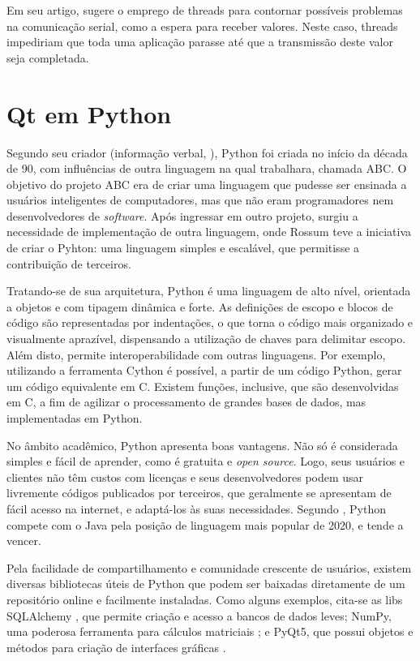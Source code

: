 Em seu artigo,  sugere o emprego de threads para contornar possíveis problemas na comunicação serial, como a espera para receber valores. Neste caso, threads impediriam que toda uma aplicação parasse até que a transmissão deste valor seja completada. 

\section{Qt em Python}

Segundo seu criador (informação verbal, \cite{Rossum2003}), Python foi criada no início da década de 90, com influências de outra linguagem na qual trabalhara, chamada ABC. O objetivo do projeto ABC era de criar uma linguagem que pudesse ser ensinada a usuários inteligentes de computadores, mas que não eram programadores nem desenvolvedores de \textit{software}. Após ingressar em outro projeto, surgiu a necessidade de implementação de outra linguagem, onde Rossum teve a iniciativa de criar o Pyhton: uma  linguagem simples e escalável, que permitisse a contribuição de terceiros.

Tratando-se de sua arquitetura, Python é uma linguagem de alto nível, orientada a objetos e com tipagem dinâmica e forte. As definições de escopo e blocos de código são representadas por indentações, o que torna o código mais organizado e visualmente aprazível, dispensando a utilização de chaves para delimitar escopo. Além disto, permite interoperabilidade com outras linguagens. Por exemplo, utilizando a ferramenta Cython é possível, a partir de um código Python, gerar um código equivalente em C. Existem funções, inclusive, que são desenvolvidas em C, a fim de agilizar o processamento de grandes bases de dados, mas implementadas em Python.

No âmbito acadêmico, Python apresenta boas vantagens. Não só é considerada simples e fácil de aprender, como é gratuita e \textit{open source}. Logo, seus usuários e clientes não têm custos com licenças e seus desenvolvedores podem usar livremente códigos publicados por terceiros, que geralmente se apresentam de fácil acesso na internet, e adaptá-los às suas necessidades. Segundo , Python compete com o Java pela posição de linguagem mais popular de 2020, e tende a vencer.

Pela facilidade de compartilhamento e comunidade crescente de usuários, existem diversas bibliotecas úteis de Python que podem ser baixadas diretamente de um repositório online e facilmente instaladas. Como alguns exemplos, cita-se as libs SQLAlchemy \cite{sqlalchemy}, que permite criação e acesso a bancos de dados leves; NumPy, uma poderosa ferramenta para cálculos matriciais \cite{harris2020array}; e PyQt5, que possui objetos e métodos para criação de interfaces gráficas \cite{QT2020}.

